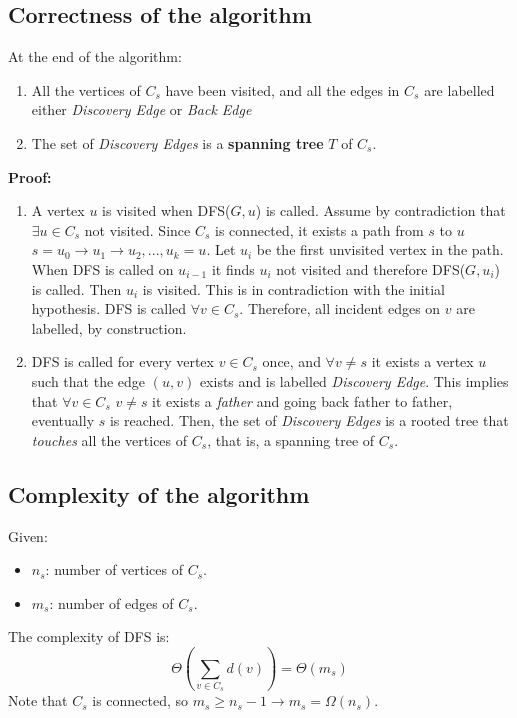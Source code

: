 \subsection{Correctness of the algorithm}
At the end of the algorithm:
\begin{enumerate}
    \item All the vertices of $C_{s}$ have been visited, and all the edges in $C_{s}$ are labelled either \textit{Discovery Edge} or \textit{Back Edge}

    \item The set of \textit{Discovery Edges} is a \textbf{spanning tree} $T$ of $C_{s}$.
\end{enumerate}
\textbf{Proof:}
\begin{enumerate}
    \item A vertex $u$ is visited when DFS($G, u$) is called. Assume by contradiction that $\exists u \in C_{s}$ not visited. Since $C_{s}$ is connected, it exists a path from $s$ to $u$ $s=u_{0} \rightarrow u_{1} \rightarrow u_{2}, ..., u_{k}=u$. Let $u_{i}$ be the first unvisited vertex in the path. When DFS is called on $u_{i - 1}$ it finds $u_{i}$ not visited and therefore DFS($G, u_{i}$) is called. Then $u_{i}$ is visited. This is in contradiction with the initial hypothesis.\newline\newline
    DFS is called $\forall v \in C_{s}$. Therefore, all incident edges on $v$ are labelled, by construction.

    \item DFS is called for every vertex $v \in C_{s}$ once, and $\forall v \neq s$ it exists a vertex $u$ such that the edge $(u, v)$ exists and is labelled \textit{Discovery Edge}. This implies that $\forall v \in C_{s} \,\, v \neq s$ it exists a \textit{father} and going back father to father, eventually $s$ is reached. Then, the set of \textit{Discovery Edges} is a rooted tree that \textit{touches} all the vertices of $C_{s}$, that is, a spanning tree of $C_{s}$.
\end{enumerate}

\subsection{Complexity of the algorithm}
Given:
\begin{itemize}
    \item $n_{s}$: number of vertices of $C_{s}$.
    \item $m_{s}$: number of edges of $C_{s}$.
\end{itemize}
The complexity of DFS is:
\[\Theta\left( \sum_{v \in C_{s}} d(v)\right) = \Theta(m_{s})\]
Note that $C_{s}$ is connected, so $m_{s} \geq n_{s} - 1 \rightarrow m_{s} = \Omega(n_{s})$.

